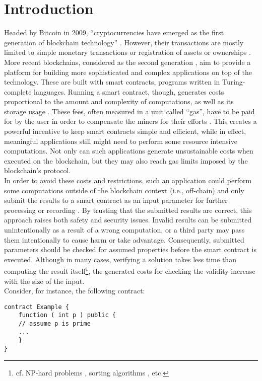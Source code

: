 \chapter{Introduction}\label{chap:introduction}
Headed by Bitcoin in 2009, ``cryptocurrencies have emerged as the first generation of blockchain technology'' \cite{alharby_blockchain_2017}. However, their transactions are mostly limited to simple monetary transactions or registration of assets or ownerships \cite{alharby_blockchain_2017}. More recent blockchains, considered as the second generation \cite{alharby_blockchain_2017}, aim to provide a platform for building more sophisticated and complex applications on top of the technology. These are built with smart contracts, programs written in Turing-complete languages. Running a smart contract, though, generates costs proportional to the amount and complexity of computations, as well as its storage usage \cite{alharby_blockchain_2017}. These fees, often measured in a unit called ``gas'', have to be paid for by the user in order to compensate the miners for their efforts \cite{chen_under-optimized_2020}. This creates a powerful incentive to keep smart contracts simple and efficient, while in effect, meaningful applications still might need to perform some resource intensive computations. Not only can such applications generate unsustainable costs when executed on the blockchain, but they may also reach gas limits imposed by the blockchain's protocol. \\
In order to avoid these costs and restrictions, such an application could perform some computations outside of the blockchain context (i.e., off-chain) and only submit the results to a smart contract as an input parameter for further processing or recording \cite{thiemann_2020}. By trusting that the submitted results are correct, this approach raises both safety and security issues. Invalid results can be submitted unintentionally as a result of a wrong computation, or a third party may pass them intentionally to cause harm or take advantage. Consequently, submitted parameters should be checked for assumed properties before the smart contract is executed. Although in many cases, verifying a solution takes less time than computing the result itself\footnote{cf. NP-hard problems \cite{nph_problems}, sorting algorithms \cite{review_sorting}\cite{cpp_issorted}, etc.}, the generated costs for checking the validity increase with the size of the input. \\
Consider, for instance, the following contract:
\begin{lstlisting}[caption=Smart contract expecting a prime number \cite{thiemann_2020}, numbers=none, language=Solidity, label=lst:prime]
contract Example {
	function ( int p ) public {
	// assume p is prime
	...
	}
}
\end{lstlisting}

